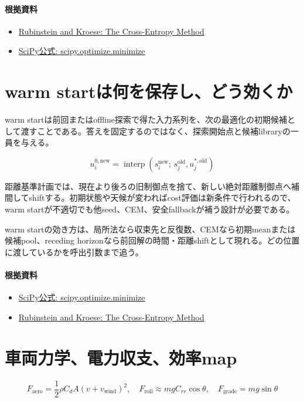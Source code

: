 \documentclass[a4paper,11pt]{article}
\begin{document}
\paragraph{根拠資料}
\begin{itemize}[leftmargin=1.6em]
\item \href{https://link.springer.com/book/10.1007/978-1-4757-4321-0}{Rubinstein and Kroese: The Cross-Entropy Method}
\item \href{https://docs.scipy.org/doc/scipy/reference/generated/scipy.optimize.minimize.html}{SciPy公式: scipy.optimize.minimize}
\end{itemize}

\section{warm startは何を保存し、どう効くか}
warm startは前回またはoffline探索で得た入力系列を、次の最適化の初期候補として渡すことである。答えを固定するのではなく、探索開始点と候補libraryの一員を与える。


\[
u^{0,\mathrm{new}}_i=\operatorname{interp}\left(s_i^{\mathrm{new}};\,s_j^{\mathrm{old}},u_j^{\ast,\mathrm{old}}\right)
\]

距離基準計画では、現在より後ろの旧制御点を捨て、新しい絶対距離制御点へ補間してshiftする。初期状態や天候が変わればcost評価は新条件で行われるので、warm startが不適切でも他seed、CEM、安全fallbackが補う設計が必要である。


warm startの効き方は、局所法なら収束先と反復数、CEMなら初期meanまたは候補pool、receding horizonなら前回解の時間・距離shiftとして現れる。どの位置に渡しているかを呼出引数まで追う。

\paragraph{根拠資料}
\begin{itemize}[leftmargin=1.6em]
\item \href{https://docs.scipy.org/doc/scipy/reference/generated/scipy.optimize.minimize.html}{SciPy公式: scipy.optimize.minimize}
\item \href{https://link.springer.com/book/10.1007/978-1-4757-4321-0}{Rubinstein and Kroese: The Cross-Entropy Method}
\end{itemize}

\section{車両力学、電力収支、効率map}
\[
F_{\mathrm{aero}}=\frac{1}{2}\rho C_dA(v+v_{\mathrm{wind}})^2,\quad F_{\mathrm{roll}}\approx mgC_{rr}\cos\theta,\quad F_{\mathrm{grade}}=mg\sin\theta
\]
\end{document}
